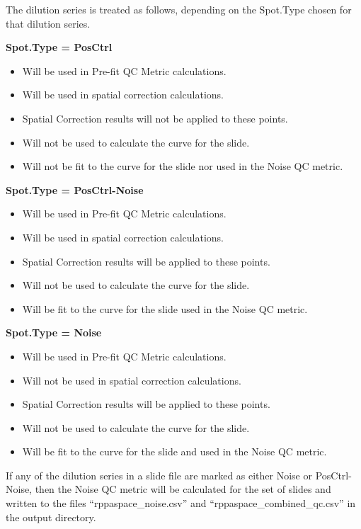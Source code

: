 \documentclass[
]{article}
\providecommand{\tightlist}{%
  \setlength{\itemsep}{0pt}\setlength{\parskip}{0pt}}
\begin{document}
The dilution series is treated as follows, depending on the Spot.Type
chosen for that dilution series.

\textbf{Spot.Type = PosCtrl}

\begin{itemize}
\tightlist
\item
  Will be used in Pre-fit QC Metric calculations.
\item
  Will be used in spatial correction calculations.
\item
  Spatial Correction results will not be applied to these points.
\item
  Will not be used to calculate the curve for the slide.
\item
  Will not be fit to the curve for the slide nor used in the Noise QC
  metric.
\end{itemize}

\textbf{Spot.Type = PosCtrl-Noise}

\begin{itemize}
\tightlist
\item
  Will be used in Pre-fit QC Metric calculations.
\item
  Will be used in spatial correction calculations.
\item
  Spatial Correction results will be applied to these points.
\item
  Will not be used to calculate the curve for the slide.
\item
  Will be fit to the curve for the slide used in the Noise QC metric.
\end{itemize}

\textbf{Spot.Type = Noise}

\begin{itemize}
\tightlist
\item
  Will be used in Pre-fit QC Metric calculations.
\item
  Will not be used in spatial correction calculations.
\item
  Spatial Correction results will be applied to these points.
\item
  Will not be used to calculate the curve for the slide.
\item
  Will be fit to the curve for the slide and used in the Noise QC
  metric.
\end{itemize}

If any of the dilution series in a slide file are marked as either Noise
or PosCtrl-Noise, then the Noise QC metric will be calculated for the
set of slides and written to the files ``rppaspace\_noise.csv'' and
``rppaspace\_combined\_qc.csv'' in the output directory.
\end{document}
